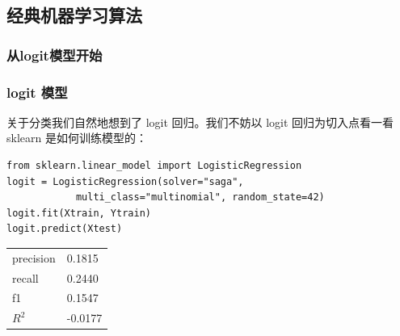 \documentclass{ctexbeamer}
\begin{document}
\subsection{经典机器学习算法}
\subsubsection{从logit模型开始}
\begin{frame}[fragile]
    \frametitle{logit 模型}
    关于分类我们自然地想到了 logit 回归。我们不妨以 logit 回归为切入点看一看 sklearn 是如何训练模型的：

    \begin{verbatim}
from sklearn.linear_model import LogisticRegression
logit = LogisticRegression(solver="saga", 
            multi_class="multinomial", random_state=42)
logit.fit(Xtrain, Ytrain)
logit.predict(Xtest)
    \end{verbatim}

    \begin{center}
        \begin{tabular}{ll}
            precision & 0.1815  \\
            recall    & 0.2440  \\
            f1        & 0.1547  \\
            \(R^2\)   & -0.0177 \\
        \end{tabular}
    \end{center}
\end{frame}
\end{document}
